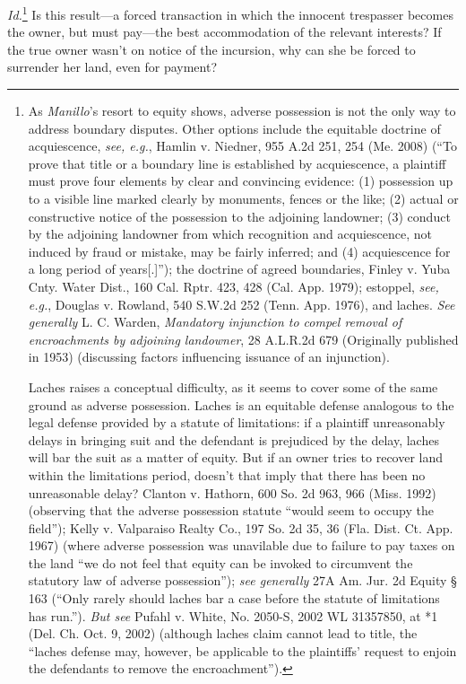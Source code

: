 \textit{Id.}\footnote{As \textit{Manillo}'s resort to equity shows, adverse
possession is not the only way to address boundary disputes. Other options
include the equitable doctrine of acquiescence, \textit{see, e.g.}, Hamlin v.
Niedner, 955 A.2d 251, 254 (Me. 2008) (``To prove that title or a boundary line
is established by acquiescence, a plaintiff must prove four elements by clear
and convincing evidence: (1) possession up to a visible line marked clearly by
monuments, fences or the like; (2) actual or constructive notice of the
possession to the adjoining landowner; (3) conduct by the adjoining landowner
from which recognition and acquiescence, not induced by fraud or mistake, may
be fairly inferred; and (4) acquiescence for a long period of years[.]''); the
doctrine of agreed boundaries, Finley v. Yuba Cnty. Water Dist., 160 Cal. Rptr.
423, 428 (Cal. App. 1979); estoppel, \textit{see, e.g.}, Douglas v. Rowland,
540 S.W.2d 252 (Tenn. App. 1976), and laches. \textit{See generally} L. C.
Warden, \textit{Mandatory injunction to compel removal of encroachments by
adjoining landowner}, 28 A.L.R.2d 679 (Originally published in 1953)
(discussing factors influencing issuance of an injunction).\par Laches raises a
conceptual difficulty, as it seems to cover some of the same ground as adverse
possession. Laches is an equitable defense analogous to the legal defense
provided by a statute of limitations: if a plaintiff unreasonably delays in
bringing suit and the defendant is prejudiced by the delay, laches will bar the
suit as a matter of equity. But if an owner tries to recover land within the
limitations period, doesn't that imply that there has been no unreasonable
delay? Clanton v. Hathorn, 600 So. 2d 963, 966 (Miss. 1992) (observing that the
adverse possession statute ``would seem to occupy the field''); Kelly v.
Valparaiso Realty Co., 197 So. 2d 35, 36 (Fla. Dist. Ct. App. 1967) (where
adverse possession was unavilable due to failure to pay taxes on the land ``we
do not feel that equity can be invoked to circumvent the statutory law of
adverse possession''); \textit{see generally} 27A Am. Jur. 2d Equity {\S} 163
(``Only rarely should laches bar a case before the statute of limitations has
run.''). \textit{But see} Pufahl v. White, No. 2050-S, 2002 WL 31357850, at *1
(Del. Ch. Oct. 9, 2002) (although laches claim cannot lead to title, the
``laches defense may, however, be applicable to the plaintiffs' request to
enjoin the defendants to remove the encroachment'').} Is this result---a forced
transaction in which the innocent trespasser becomes the owner, but must
pay---the best accommodation of the relevant interests? If the true owner
wasn't on notice of the incursion, why can she be forced to surrender her land,
even for payment?  

